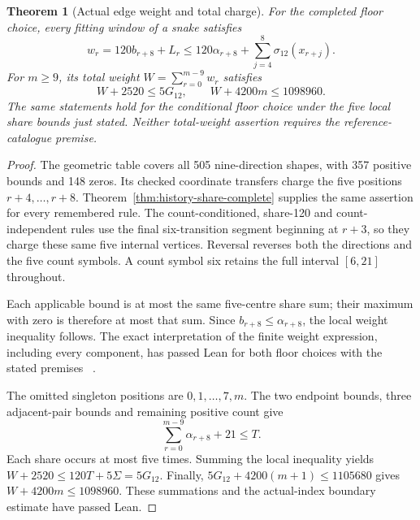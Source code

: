 \documentclass[11pt,a4paper]{article}
\newtheorem{theorem}{Theorem}[section]
\theoremstyle{definition}
\theoremstyle{remark}
\begin{document}
\begin{theorem}[Actual edge weight and total charge]\label{thm:actual-weight-budget}
For the completed floor choice, every fitting window of a snake satisfies
\[
w_r=120b_{r+8}+L_r
\le120\alpha_{r+8}+\sum_{j=4}^{8}\sigma_{12}(x_{r+j}).
\]
For $m\ge9$, its total weight $W=\sum_{r=0}^{m-9}w_r$ satisfies
\[
W+2520\le5G_{12},\qquad W+4200m\le1098960.
\]
The same statements hold for the conditional floor choice under the five
local share bounds just stated. Neither total-weight assertion requires
the reference-catalogue premise.
\end{theorem}
\begin{proof}
The geometric table covers all 505 nine-direction shapes, with 357 positive
bounds and 148 zeros. Its checked coordinate transfers charge the five
positions $r+4,\ldots,r+8$. Theorem~\ref{thm:history-share-complete} supplies
the same assertion for every remembered rule. The count-conditioned,
share-120 and count-independent rules use the final six-transition segment
beginning at $r+3$, so they charge these same five internal vertices.
Reversal reverses both the directions and the five count symbols. A count
symbol six retains the full interval $[6,21]$ throughout.

Each applicable bound is at most the same five-centre share sum; their
maximum with zero is therefore at most that sum. Since
$b_{r+8}\le\alpha_{r+8}$, the local weight inequality follows. The exact
interpretation of the finite weight expression, including every component,
has passed Lean for both floor choices with the stated premises
~\cite{weightintegrationarchive}.

The omitted singleton positions are $0,1,\ldots,7,m$. The two endpoint
bounds, three adjacent-pair bounds and remaining positive count give
\[
\sum_{r=0}^{m-9}\alpha_{r+8}+21\le T.
\]
Each share occurs at most five times. Summing the local inequality yields
$W+2520\le120T+5\Sigma=5G_{12}$. Finally,
$5G_{12}+4200(m+1)\le1105680$ gives $W+4200m\le1098960$.
These summations and the actual-index boundary estimate have passed Lean.
\end{proof}
\end{document}
